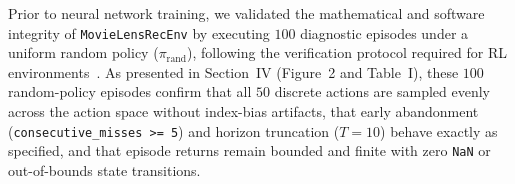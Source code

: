 Prior to neural network training, we validated the mathematical and software integrity of \texttt{MovieLensRecEnv} by executing $100$ diagnostic episodes under a uniform random policy ($\pi_{\text{rand}}$), following the verification protocol required for RL environments~\cite{raffin2021stable}. As presented in Section~IV (Figure~2 and Table~I), these $100$ random-policy episodes confirm that all $50$ discrete actions are sampled evenly across the action space without index-bias artifacts, that early abandonment (\texttt{consecutive\_misses >= 5}) and horizon truncation ($T=10$) behave exactly as specified, and that episode returns remain bounded and finite with zero \texttt{NaN} or out-of-bounds state transitions.
